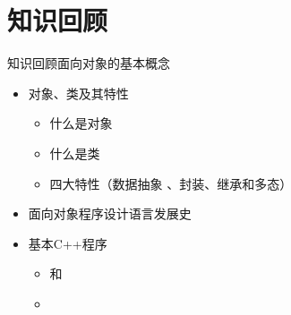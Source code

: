 \section[知识回顾]{知识回顾}\label{sec:chap02-sec00}
\begin{frame}[t, fragile]{知识回顾}{面向对象的基本概念}
  \stretchon
  \begin{itemize}
  \item 对象、类及其特性%
    \begin{itemize}
    \item 什么是对象
    \item 什么是类
    \item 四大特性（数据抽象 、封装、继承和多态）
    \end{itemize}
  \item 面向对象程序设计语言发展史    
  \item 基本C++程序
    \begin{itemize}
    \item {} 和 
    \item {}
    \end{itemize}
  \end{itemize}
  \stretchoff
\end{frame}

